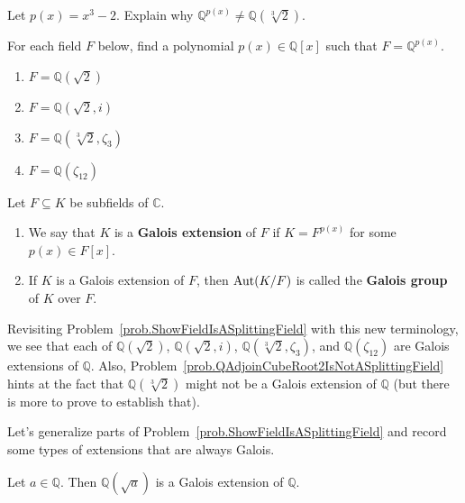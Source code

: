 \begin{problem}\label{prob.QAdjoinCubeRoot2IsNotASplittingField}
Let $p(x) = x^3 - 2$. Explain why $\mathbb{Q}^{p(x)}\neq\mathbb{Q}(\sqrt[3]{2})$.
\end{problem}

\begin{problem}\label{prob.ShowFieldIsASplittingField}
For each field $F$ below, find a polynomial $p(x)\in \mathbb{Q}[x]$ such that $F=\mathbb{Q}^{p(x)}$.
\begin{multicols}{2}
\begin{enumerate}
\item $F=\mathbb{Q}(\sqrt{2})$
\item $F=\mathbb{Q}(\sqrt{2},i)$
\item $F=\mathbb{Q}(\sqrt[3]{2},\zeta_3)$
\item $F=\mathbb{Q}(\zeta_{12})$
\end{enumerate}
\end{multicols}
\end{problem}

\begin{definition}
Let $F\subseteq K$ be subfields of $\mathbb{C}$.
\begin{enumerate}
\item We say that $K$ is a \textbf{Galois extension} of $F$ if $K = F^{p(x)}$ for some $p(x) \in F[x]$.
\item If $K$ is a Galois extension of $F$, then $\operatorname{Aut}(K/F)$ is called the \textbf{Galois group} of $K$ over $F$.
\end{enumerate}
\end{definition}

Revisiting Problem~\ref{prob.ShowFieldIsASplittingField} with this new terminology, we see that each of $\mathbb{Q}(\sqrt{2})$, $\mathbb{Q}(\sqrt{2},i)$, $\mathbb{Q}(\sqrt[3]{2},\zeta_3)$, and $\mathbb{Q}(\zeta_{12})$ are Galois extensions of $\mathbb{Q}$. Also, Problem~\ref{prob.QAdjoinCubeRoot2IsNotASplittingField} hints at the fact that $\mathbb{Q}(\sqrt[3]{2})$ might not be a Galois extension of $\mathbb{Q}$ (but there is more to prove to establish that).

Let's generalize parts of Problem~\ref{prob.ShowFieldIsASplittingField} and record some types of extensions that are always Galois.

\begin{theorem}\label{thm.QAdjoinSquareRootIsGalois}
Let $a\in \mathbb{Q}$. Then $\mathbb{Q}(\sqrt{a})$ is a Galois extension of $\mathbb{Q}$.
\end{theorem}

